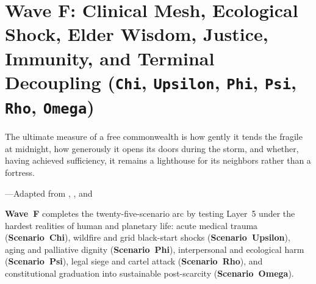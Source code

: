 \chapter{Wave F: Clinical Mesh, Ecological Shock, Elder Wisdom, Justice, Immunity, and Terminal Decoupling (\texttt{Chi}, \texttt{Upsilon}, \texttt{Phi}, \texttt{Psi}, \texttt{Rho}, \texttt{Omega})}
\label{ch:l5-wave-f}

\epigraph{The ultimate measure of a free commonwealth is how gently it tends the fragile at midnight, how generously it opens its doors during the storm, and whether, having achieved sufficiency, it remains a lighthouse for its neighbors rather than a fortress.}{---Adapted from \textcite{kropotkin1902}, \textcite{zehr1990}, and \textcite{ostrom2010}}

\textbf{Wave~F} completes the twenty-five-scenario arc by testing Layer~5 under the hardest realities
of human and planetary life: acute medical trauma (\textbf{Scenario~Chi}), wildfire and grid
black-start shocks (\textbf{Scenario~Upsilon}), aging and palliative dignity (\textbf{Scenario~Phi}),
interpersonal and ecological harm (\textbf{Scenario~Psi}), legal siege and cartel attack
(\textbf{Scenario~Rho}), and constitutional graduation into sustainable post-scarcity
(\textbf{Scenario~Omega}).

